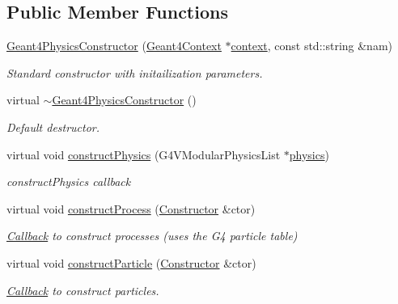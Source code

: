 \subsection*{Public Member Functions}
\begin{DoxyCompactItemize}
\item 
\hyperlink{class_d_d4hep_1_1_simulation_1_1_geant4_physics_constructor_a64ea9fcabe64e3fe28ed25cf2e707e55}{Geant4\+Physics\+Constructor} (\hyperlink{class_d_d4hep_1_1_simulation_1_1_geant4_context}{Geant4\+Context} $\ast$\hyperlink{class_d_d4hep_1_1_simulation_1_1_geant4_action_aa9d87f0ec2a72b7fc2591b18f98d75cf}{context}, const std\+::string \&nam)
\begin{DoxyCompactList}\small\item\em Standard constructor with initailization parameters. \end{DoxyCompactList}\item 
virtual \hyperlink{class_d_d4hep_1_1_simulation_1_1_geant4_physics_constructor_af600587461631109af619f9f2b252653}{$\sim$\+Geant4\+Physics\+Constructor} ()
\begin{DoxyCompactList}\small\item\em Default destructor. \end{DoxyCompactList}\item 
virtual void \hyperlink{class_d_d4hep_1_1_simulation_1_1_geant4_physics_constructor_a97b80e1316943ae5805d8d006fa4f1b5}{construct\+Physics} (G4\+V\+Modular\+Physics\+List $\ast$\hyperlink{class_d_d4hep_1_1_simulation_1_1_geant4_physics_list_a02c18b4acdacd390c3c1b1c4609f1c7b}{physics})
\begin{DoxyCompactList}\small\item\em construct\+Physics callback \end{DoxyCompactList}\item 
virtual void \hyperlink{class_d_d4hep_1_1_simulation_1_1_geant4_physics_constructor_a11d516af4f7dcfefe4fa7f154cba4386}{construct\+Process} (\hyperlink{class_d_d4hep_1_1_simulation_1_1_geant4_physics_constructor_1_1_constructor}{Constructor} \&ctor)
\begin{DoxyCompactList}\small\item\em \hyperlink{class_d_d4hep_1_1_callback}{Callback} to construct processes (uses the G4 particle table) \end{DoxyCompactList}\item 
virtual void \hyperlink{class_d_d4hep_1_1_simulation_1_1_geant4_physics_constructor_a2568ea7c84c0514818e665c409efa304}{construct\+Particle} (\hyperlink{class_d_d4hep_1_1_simulation_1_1_geant4_physics_constructor_1_1_constructor}{Constructor} \&ctor)
\begin{DoxyCompactList}\small\item\em \hyperlink{class_d_d4hep_1_1_callback}{Callback} to construct particles. \end{DoxyCompactList}\end{DoxyCompactItemize}
